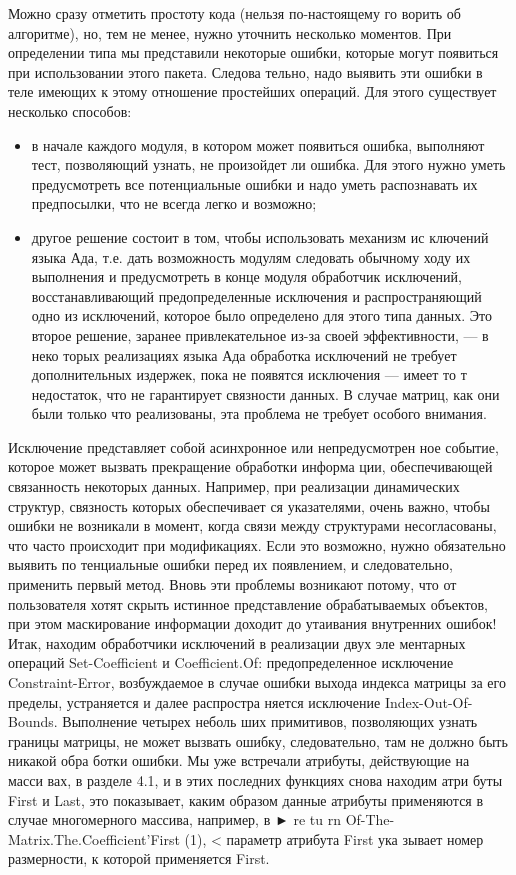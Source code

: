 \documentclass{../../template/mai_book}
\begin{document}
Можно сразу отметить простоту кода (нельзя по-настоящему го­
	ворить об алгоритме), но, тем не менее, нужно уточнить несколько
моментов. При определении типа мы представили некоторые ошибки,
которые могут появиться при использовании этого пакета. Следова­
тельно, надо выявить эти ошибки в теле имеющих к этому отношение
простейших операций. Для этого существует несколько способов:


\begin{itemize}  
\item в начале каждого модуля, в котором может появиться ошибка,
выполняют тест, позволяющий узнать, не произойдет ли ошибка.
Для этого нужно уметь предусмотреть все потенциальные ошибки
и надо уметь распознавать их предпосылки, что не всегда легко
и возможно;
\item другое решение состоит в том, чтобы использовать механизм ис­
ключений языка Ада, т.е. дать возможность модулям следовать
\newpage
обычному ходу их выполнения и предусмотреть в конце модуля
обработчик исключений, восстанавливающий предопределенные
исключения и распространяющий одно из исключений, которое
было определено для этого типа данных. Это второе решение,
заранее привлекательное из-за своей эффективности, — в неко­
торых реализациях языка Ада обработка исключений не требует
дополнительных издержек, пока не появятся исключения — имеет
то т недостаток, что не гарантирует связности данных. В случае
матриц, как они были только что реализованы, эта проблема не
требует особого внимания.
\end{itemize}

Исключение представляет собой асинхронное или непредусмотрен­
ное событие, которое может вызвать прекращение обработки информа­
ции, обеспечивающей связанность некоторых данных. Например, при
реализации динамических структур, связность которых обеспечивает­
ся указателями, очень важно, чтобы ошибки не возникали в момент,
когда связи между структурами несогласованы, что часто происходит
при модификациях. Если это возможно, нужно обязательно выявить по­
тенциальные ошибки перед их появлением, и следовательно, применить
первый метод.
Вновь эти проблемы возникают потому, что от пользователя хотят
скрыть истинное представление обрабатываемых объектов, при этом
маскирование информации доходит до утаивания внутренних ошибок!
Итак, находим обработчики исключений в реализации двух эле­
ментарных операций Set-Coefficient и Coefficient.Of: предопределенное
исключение Constraint-Error, возбуждаемое в случае ошибки выхода
индекса матрицы за его пределы, устраняется и далее распростра­
няется исключение Index-Out-Of-Bounds. Выполнение четырех неболь­
ших примитивов, позволяющих узнать границы матрицы, не может
вызвать ошибку, следовательно, там не должно быть никакой обра­
ботки ошибки. Мы уже встречали атрибуты, действующие на масси­
вах, в разделе 4.1, и в этих последних функциях снова находим атри­
буты First и Last, это показывает, каким образом данные атрибуты
применяются в случае многомерного массива, например, в ► re tu rn
Of-The-Matrix.The.Coefficient’First (1), < параметр атрибута First ука­
зывает номер размерности, к которой применяется First.
\end{document}
